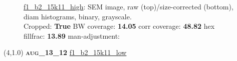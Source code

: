 \begin{figure}[h!]
\label{semimg12}
\caption*{\hyperlink{covtableaug_13_12}{\color{blue} \small \ttfamily f1\_b2\_15k11\_high}: SEM image, raw (top)/size-corrected (bottom), diam histograms, binary, grayscale.\\Cropped: {\bf True} \;\; BW coverage: {\bf 14.05} \:\: corr coverage: {\bf 48.82} \:\: hex fillfrac: {\bf 13.89} \:\: man-adjustment: {\bf \color{blue}{Yes}}}
\end{figure}
\newpage

\begin{textblock}{5}(4,1.0)
{\bf \textsc{aug\_13\_12}}
\hspace{4.5cm}
\hyperlink{covtableaug_13_12}{\color{blue} \large \ttfamily f1\_b2\_15k11\_low}
\end{textblock}

